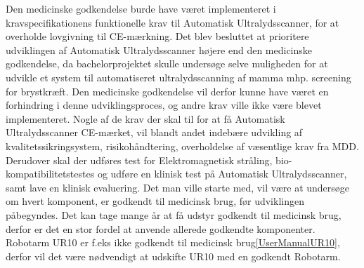 Den medicinske godkendelse burde have været implementeret i kravspecifikationens funktionelle krav til Automatisk Ultralydsscanner, for at overholde lovgivning til CE-mærkning. Det blev besluttet at prioritere udviklingen af Automatisk Ultralydsscanner højere end den medicinske godkendelse, da bachelorprojektet skulle undersøge selve muligheden for at udvikle et system til automatiseret ultralydsscanning af mamma mhp. screening for brystkræft. Den medicinske godkendelse vil derfor kunne have været en forhindring i denne udviklingsproces, og andre krav ville ikke være blevet implementeret. 
Nogle af de krav der skal til for at få Automatisk Ultralydsscanner CE-mærket, vil blandt andet indebære udvikling af kvalitetssikringsystem, risikohåndtering, overholdelse af væsentlige krav fra MDD. Derudover skal der udføres test for Elektromagnetisk stråling, bio-kompatibilitetstestes og udføre en klinisk test på Automatisk Ultralydsscanner, samt lave en klinisk evaluering. Det man ville starte med, vil være at undersøge om hvert komponent, er godkendt til medicinsk brug, før udviklingen påbegyndes. Det kan tage mange år at få udstyr godkendt til medicinsk brug, derfor er det en stor fordel at anvende allerede godkendte komponenter. Robotarm UR10 er f.eks ikke godkendt til medicinsk brug\ref{UserManualUR10}, derfor vil det være nødvendigt at udskifte UR10 med en godkendt Robotarm. 
